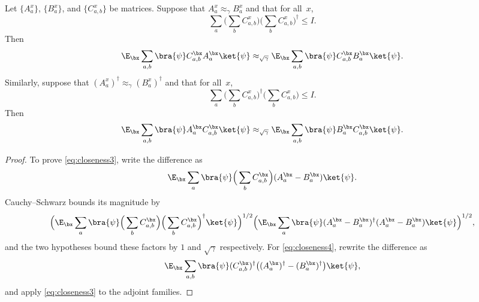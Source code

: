 \begin{theorem}\label{prop:closeness-of-ip}
	\leanok
	Let $\{A^x_a\}$, $\{B^x_a\}$, and $\{C^x_{a,b}\}$ be matrices. Suppose that $A^x_a \approx_\gamma B^x_a$ and that for all~$x$,
	\[
		\sum_a \Big(\sum_b C^x_{a,b}\Big) \Big(\sum_b C^x_{a,b}\Big)^\dagger \le I.
	\]
	Then
	\begin{equation}
		\E_{\bx} \sum_{a,b} \bra{\psi} C^{\bx}_{a,b} A^{\bx}_a  \ket{\psi} \approx_{\sqrt{\gamma}} \E_{\bx} \sum_{a,b} \bra{\psi} C^{\bx}_{a,b} B^{\bx}_a  \ket{\psi}. \label{eq:closeness3}
	\end{equation}
	Similarly, suppose that $(A^x_a)^\dagger \approx_\gamma (B^x_a)^\dagger$ and that for all~$x$,
	\[
		\sum_a \Big(\sum_b C^x_{a,b}\Big)^\dagger \Big(\sum_b C^x_{a,b}\Big) \le I.
	\]
	Then
	\begin{equation}
		\E_{\bx} \sum_{a,b} \bra{\psi} A^{\bx}_a  C^{\bx}_{a,b} \ket{\psi} \approx_{\sqrt{\gamma}} \E_{\bx} \sum_{a,b} \bra{\psi} B^{\bx}_a  C^{\bx}_{a,b}  \ket{\psi}. \label{eq:closeness4}
	\end{equation}
\end{theorem}
\begin{proof}
	\leanok
	To prove \eqref{eq:closeness3}, write the difference as
	\[
		\E_{\bx} \sum_a \bra{\psi} \Big(\sum_b C^\bx_{a,b}\Big) (A^\bx_a-B^\bx_a) \ket{\psi}.
	\]
	Cauchy--Schwarz bounds its magnitude by
	\[
		\Big( \E_{\bx} \sum_a \bra{\psi} \Big(\sum_b C^{\bx}_{a,b}\Big)\Big(\sum_b C^{\bx}_{a,b}\Big)^\dagger \ket{\psi} \Big)^{1/2}
		\Big( \E_{\bx} \sum_a \bra{\psi} (A^{\bx}_a - B^{\bx}_a)^\dagger (A^{\bx}_a - B^{\bx}_a) \ket{\psi} \Big)^{1/2},
	\]
	and the two hypotheses bound these factors by $1$ and $\sqrt{\gamma}$ respectively. For \eqref{eq:closeness4}, rewrite the difference as
	\[
		\E_{\bx} \sum_{a,b} \bra{\psi} (C^{\bx}_{a,b})^\dagger \big((A^{\bx}_a)^\dagger-(B^{\bx}_a)^\dagger\big) \ket{\psi},
	\]
	and apply \eqref{eq:closeness3} to the adjoint families.
\end{proof}

